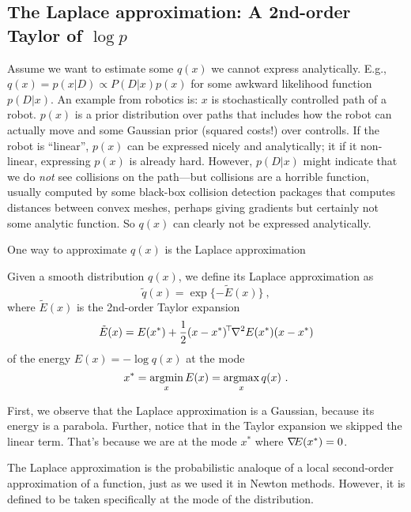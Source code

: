 \subsection{The Laplace approximation: A 2nd-order Taylor of
$\log p$}

Assume we want to estimate some $q(x)$ we cannot express
analytically. E.g., $q(x) =p(x|D) \propto P(D|x) p(x)$ for some
awkward likelihood function $p(D|x)$. An example from robotics is: $x$
is stochastically controlled path of a robot. $p(x)$ is a prior
distribution over paths that includes how the robot can actually move
and some Gaussian prior (squared costs!) over controlls. If the robot
is ``linear'', $p(x)$ can be expressed nicely and analytically; it if
it non-linear, expressing $p(x)$ is already hard. However, $p(D|x)$
might indicate that we do \emph{not} see collisions on the path---but
collisions are a horrible function, usually computed by some black-box
collision detection packages that computes distances between convex
meshes, perhaps giving gradients but certainly not some analytic
function. So $q(x)$ can clearly not be expressed analytically.

One way to approximate $q(x)$ is the Laplace approximation
\begin{myDefinition}
Given a smooth distribution $q(x)$, we define its Laplace approximation as
\begin{equation}
\tilde q(x) = \exp\{ - \tilde E(x) \} ~, 
\end{equation}
where $\tilde E(x)$ is the 2nd-order Taylor expansion
\begin{equation}
\tilde E(x) = E(x^*) + \frac{1}{2} (x-x^*)^{\!\top\!} {\nabla_{\!\!}^2} E(x^*) (x-x^*)
\end{equation}
of the energy $E(x) = -\log q(x)$ at the mode
\begin{equation}
x^* = \operatorname*{argmin}_x E(x) = \operatorname*{argmax}_x q(x) ~.
\end{equation}
\end{myDefinition}

First, we observe that the Laplace approximation is a Gaussian,
because its energy is a parabola. Further, notice that in the Taylor
expansion we skipped the linear term. That's because we are at the
mode $x^*$ where ${\nabla_{\!\!}} E(x^*)=0$.

The Laplace approximation is the probabilistic analoque of a
local second-order approximation of a function, just as we used it in
Newton methods. However, it is defined to be taken specifically at the
mode of the distribution.

